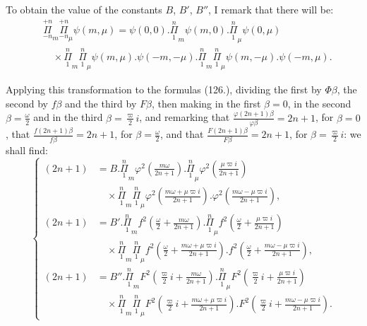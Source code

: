 \documentclass{article}
\begin{document}

To obtain the value of the constants $B$, $B'$, $B''$, I remark that there will be:
\[ \begin{aligned}
&\overset{+n}{\underset{-n}{\Pi}}_{m}\overset{+n}{\underset{-n}{\Pi}}_{\mu}\psi(m,\mu)=\psi(0,0).\overset{n}{\underset{1}{\Pi}}_{m}\psi(m,0).\overset{n}{\underset{1}{\Pi}}_{\mu}\psi(0,\mu)\\
&\quad\times\overset{n}{\underset{1}{\Pi}}_{m}\overset{n}{\underset{1}{\Pi}}_{\mu}\psi(m,\mu).\psi(-m,-\mu).\overset{n}{\underset{1}{\Pi}}_{m}\overset{n}{\underset{1}{\Pi}}_{\mu}\psi(m,-\mu).\psi(-m,\mu).
\end{aligned} \tag{127.} \]

Applying this transformation to the formulas (126.), dividing the first by $\Phi\beta$, the second by $f\beta$ and the third by $F\beta$, then making in the first $\beta=0$, in the second $\beta=\frac{\omega}{2}$ and in the third $\beta=\frac{\varpi}{2}i$, and remarking that $\frac{\varphi(2n+1)\beta}{\varphi\beta}=2n+1$, for $\beta=0$, that $\frac{f(2n+1)\beta}{f\beta}=2n+1$, for $\beta=\frac{\omega}{2}$, and that $\frac{F(2n+1)\beta}{F\beta}=2n+1$, for $\beta=\frac{\varpi}{2}i$: we shall find:
\[ \left\{\begin{aligned}
(2n+1)&=B.\overset{n}{\underset{1}{\Pi}}_{m}\varphi^{2}\left(\frac{m\omega}{2n+1}\right).\overset{n}{\underset{1}{\Pi}}_{\mu}\varphi^{2}\left(\frac{\mu\varpi i}{2n+1}\right)\\
&\quad\times\overset{n}{\underset{1}{\Pi}}_{m}\overset{n}{\underset{1}{\Pi}}_{\mu}\varphi^{2}\left(\frac{m\omega+\mu\varpi i}{2n+1}\right).\varphi^{2}\left(\frac{m\omega-\mu\varpi i}{2n+1}\right),\\
(2n+1)&=B'.\overset{n}{\underset{1}{\Pi}}_{m}f^{2}\left(\frac{\omega}{2}+\frac{m\omega}{2n+1}\right).\overset{n}{\underset{1}{\Pi}}_{\mu}f^{2}\left(\frac{\omega}{2}+\frac{\mu\varpi i}{2n+1}\right)\\
&\quad\times\overset{n}{\underset{1}{\Pi}}_{m}\overset{n}{\underset{1}{\Pi}}_{\mu}f^{2}\left(\frac{\omega}{2}+\frac{m\omega+\mu\varpi i}{2n+1}\right).f^{2}\left(\frac{\omega}{2}+\frac{m\omega-\mu\varpi i}{2n+1}\right),\\
(2n+1)&=B''.\overset{n}{\underset{1}{\Pi}}_{m}F^{2}\left(\frac{\varpi}{2}i+\frac{m\omega}{2n+1}\right).\overset{n}{\underset{1}{\Pi}}_{\mu}F^{2}\left(\frac{\varpi}{2}i+\frac{\mu\varpi i}{2n+1}\right)\\
&\quad\times\overset{n}{\underset{1}{\Pi}}_{m}\overset{n}{\underset{1}{\Pi}}_{\mu}F^{2}\left(\frac{\varpi}{2}i+\frac{m\omega+\mu\varpi i}{2n+1}\right).F^{2}\left(\frac{\varpi}{2}i+\frac{m\omega-\mu\varpi i}{2n+1}\right).
\end{aligned}\right. \tag{128.} \]
\end{document}
